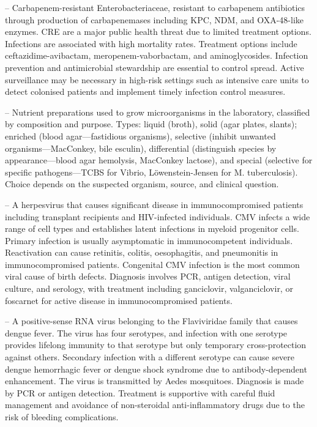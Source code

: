-- Carbapenem-resistant Enterobacteriaceae, resistant to carbapenem antibiotics through production of carbapenemases including KPC, NDM, and OXA-48-like enzymes. CRE are a major public health threat due to limited treatment options. Infections are associated with high mortality rates. Treatment options include ceftazidime-avibactam, meropenem-vaborbactam, and aminoglycosides. Infection prevention and antimicrobial stewardship are essential to control spread. Active surveillance may be necessary in high-risk settings such as intensive care units to detect colonised patients and implement timely infection control measures.

-- Nutrient preparations used to grow microorganisms in the laboratory, classified by composition and purpose. Types: liquid (broth), solid (agar plates, slants); enriched (blood agar—fastidious organisms), selective (inhibit unwanted organisms—MacConkey, bile esculin), differential (distinguish species by appearance—blood agar hemolysis, MacConkey lactose), and special (selective for specific pathogens—TCBS for Vibrio, Löwenstein-Jensen for M. tuberculosis). Choice depends on the suspected organism, source, and clinical question.

-- A herpesvirus that causes significant disease in immunocompromised patients including transplant recipients and HIV-infected individuals. CMV infects a wide range of cell types and establishes latent infections in myeloid progenitor cells. Primary infection is usually asymptomatic in immunocompetent individuals. Reactivation can cause retinitis, colitis, oesophagitis, and pneumonitis in immunocompromised patients. Congenital CMV infection is the most common viral cause of birth defects. Diagnosis involves PCR, antigen detection, viral culture, and serology, with treatment including ganciclovir, valganciclovir, or foscarnet for active disease in immunocompromised patients.

-- A positive-sense RNA virus belonging to the Flaviviridae family that causes dengue fever. The virus has four serotypes, and infection with one serotype provides lifelong immunity to that serotype but only temporary cross-protection against others. Secondary infection with a different serotype can cause severe dengue hemorrhagic fever or dengue shock syndrome due to antibody-dependent enhancement. The virus is transmitted by Aedes mosquitoes. Diagnosis is made by PCR or antigen detection. Treatment is supportive with careful fluid management and avoidance of non-steroidal anti-inflammatory drugs due to the risk of bleeding complications.

